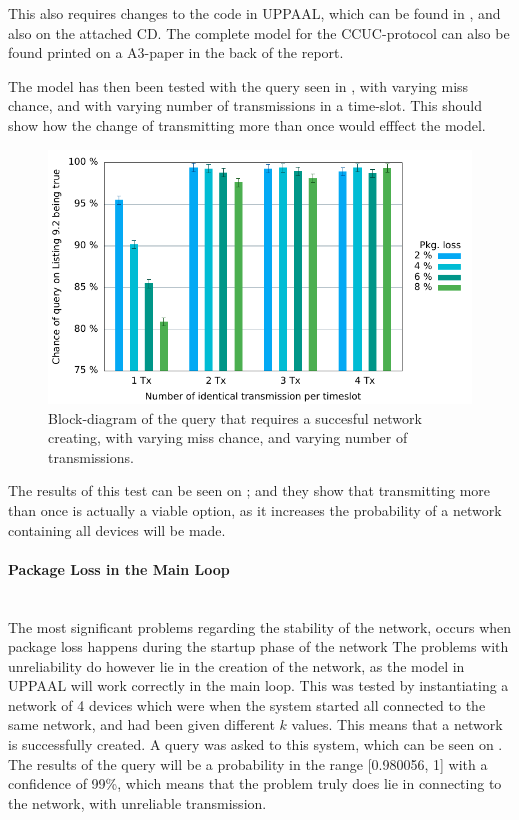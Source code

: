 This also requires changes to the code in UPPAAL, which can be found in , and also on the attached CD.
The complete model for the CCUC-protocol can also be found printed on a A3-paper in the back of the report.

The model has then been tested with the query seen in , with varying miss chance, and with varying number of transmissions in a time-slot.
This should show how the change of transmitting more than once would efffect the model.

\begin{figure}[h]
  \includegraphics[width=1\textwidth]{Figures/Graphs/gnuplot/ccucChance/graph2.pdf} 
\caption{Block-diagram of the query that requires a succesful network creating, with varying miss chance, and varying number of transmissions.}
\label{CCUC-Graph-UPPAAL}
\end{figure}

The results of this test can be seen on ; and they show that transmitting more than once is actually a viable option, as it increases the probability of a network containing all devices will be made.
\paragraph{Package Loss in the Main Loop}\hfill \\
The most significant problems regarding the stability of the network, occurs when package loss happens during the startup phase of the network
The problems with unreliability do however lie in the creation of the network, as the model in UPPAAL will work correctly in the main loop.
This was tested by instantiating a network of 4 devices which were when the system started all connected to the same network, and had been given different $k$ values. 
This means that a network is successfully created.
A query was asked to this system, which can be seen on .
The results of the query will be a probability in the range [0.980056, 1] with a confidence of 99\%, which means that the problem truly does lie in connecting to the network, with unreliable transmission. 

